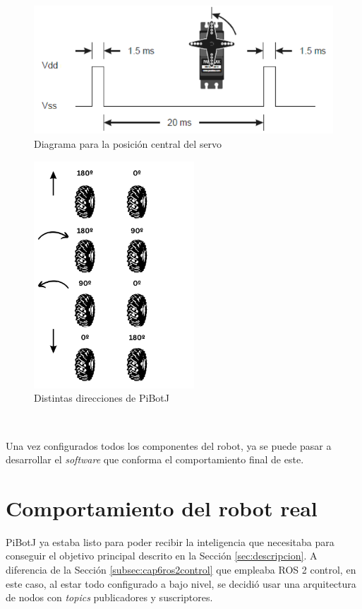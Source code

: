  \begin{figure} [h!]
	\begin{center}
		\includegraphics[width=12cm]{figs/cap6/pwm.png}
	\end{center}
	\caption{Diagrama para la posición central del servo}
	\label{fig:pwm}
\end{figure}

 \begin{figure} [h!]
	\begin{center}
		\includegraphics[width=6cm]{figs/cap6/motorlogic.png}
	\end{center}
	\caption{Distintas direcciones de PiBotJ}
	\label{fig:motorlogic}
\end{figure}\

Una vez configurados todos los componentes del robot, ya se puede pasar a desarrollar el \textit{software} que conforma el comportamiento final de este. 
 

\section{Comportamiento del robot real}
\label{sec:softwarerf}

PiBotJ ya estaba listo para poder recibir la inteligencia que necesitaba para conseguir el objetivo principal descrito en la Sección \ref{sec:descripcion}. A diferencia de la Sección \ref{subsec:cap6ros2control} que empleaba ROS 2 control, en este caso, al estar todo configurado a bajo nivel, se decidió usar una arquitectura de nodos con \textit{topics} publicadores y suscriptores.

